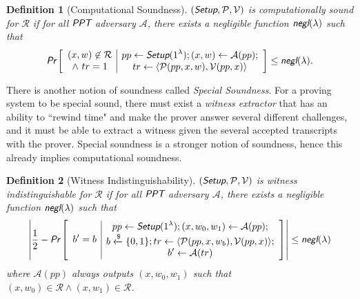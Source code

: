 \documentclass{article}
\theoremstyle{plain}
\newtheorem{definition}{Definition}[section]
\theoremstyle{remark}
\begin{document}
\begin{definition}[Computational Soundness]
$(\emph{\textsf{Setup}}, \mathcal{P}, \mathcal{V})$ is computationally sound for $\mathcal{R}$ if for all $\emph{\textsf{PPT}}$ adversary $\mathcal{A}$, there exists a negligible function $\emph{\textsf{negl}}(\lambda)$ such that
\begin{align*}
\emph{\textsf{Pr}}\left[
\begin{array}{c|c}
    \begin{gathered}
        (x,w)\not\in\mathcal{R}\\
        \wedge\ tr=1
    \end{gathered}
    &
    \begin{gathered}
        pp\leftarrow\emph{\textsf{Setup}}(1^{\lambda}); (x, w)\leftarrow\mathcal{A}(pp); \\
        tr\leftarrow\langle\mathcal{P}(pp,x,w), \mathcal{V}(pp,x)\rangle
    \end{gathered}
\end{array}
\right]
\le \emph{\textsf{negl}}(\lambda).
\end{align*}
\end{definition}

There is another notion of soundness called \textit{Special Soundness}. For a proving system to be special sound, there must exist a \textit{witness extractor} that has an ability to ``rewind time" and make the prover answer several different challenges, and it must be able to extract a witness given the several accepted transcripts with the prover. Special soundness is a stronger notion of soundness, hence this already implies computational soundness.

\begin{definition}[Witness Indistinguishability]
	$(\emph{\textsf{Setup}}, \mathcal{P}, \mathcal{V})$ is witness indistinguishable for $\mathcal{R}$ if for all $\emph{\textsf{PPT}}$ adversary $\mathcal{A}$, there exists a negligible function $\emph{\textsf{negl}}(\lambda)$ such that
	\begin{align*}
		\left| \frac{1}{2} - \emph{\textsf{Pr}}\left[
		\begin{array}{c|c}
			\begin{gathered}
				b' = b
			\end{gathered}
			&
			\begin{gathered}
				pp\leftarrow\emph{\textsf{Setup}}(1^{\lambda}); (x, w_0, w_1)\leftarrow\mathcal{A}(pp); \\
				b\xleftarrow{\$}\{0,1\}; tr\leftarrow\langle\mathcal{P}(pp,x,w_b), \mathcal{V}(pp,x)\rangle; \\
				b'\leftarrow\mathcal{A}(tr)
			\end{gathered}
		\end{array}
		\right]\right|
		\le\emph{\textsf{negl}}(\lambda)
	\end{align*}
	where $\mathcal{A}(pp)$ always outputs $(x,w_0,w_1)$ such that $(x,w_0)\in\mathcal{R}\wedge(x,w_1)\in\mathcal{R}$.
\end{definition}
\end{document}
